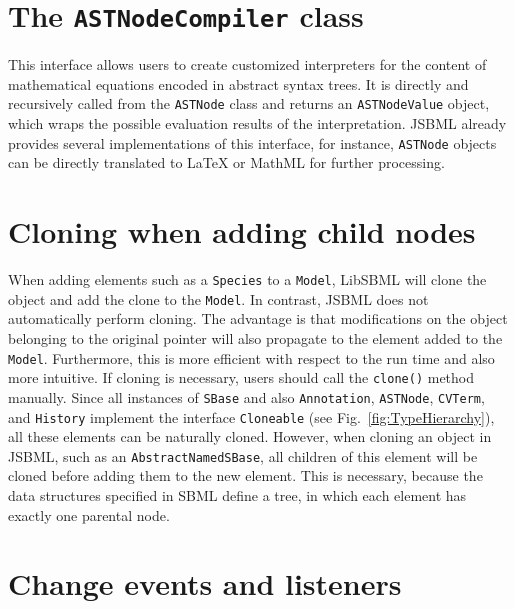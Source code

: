 \documentclass[
  BCOR12mm,
  letterpaper,
  11pt,
  headsepline,
  pointlessnumbers,
  tablecaptionabove,
  headinclude,
  appendixprefix,
  idxtotoc,
  bibtotoc,
  twoside,
  titlepage
]{scrartcl}
\begin{document}
\section{The \texttt{ASTNodeCompiler} class}

This interface allows users to create customized interpreters for the
content of mathematical equations encoded in abstract syntax trees. It
is directly and recursively called from the \verb!ASTNode! class and returns
an \verb!ASTNodeValue! object, which wraps the possible evaluation results of
the interpretation. JSBML already provides several implementations of
this interface, for instance, \verb!ASTNode! objects can be directly translated
to LaTeX or MathML for further processing.

\section{Cloning when adding child nodes}

When adding elements such as a \verb!Species! to a \verb!Model!, LibSBML will
clone the object and add the clone to the \verb!Model!. In contrast, JSBML does
not automatically perform cloning. The advantage is that modifications on the
object belonging to the original pointer will also propagate to the element
added to the \verb!Model!. Furthermore, this is more efficient with respect to
the run time and also more intuitive. If cloning is necessary, users should call
the \verb!clone()! method manually. Since all instances of \verb!SBase! and also
\verb!Annotation!, \verb!ASTNode!, \verb!CVTerm!, and \verb!History! implement
the interface \verb!Cloneable! (see Fig.~\vref{fig:TypeHierarchy}), all these
elements can be naturally cloned. However, when cloning an object in JSBML, such
as an \verb!AbstractNamedSBase!, all children of this element will be cloned
before adding them to the new element. This is necessary, because the data
structures specified in SBML define a tree, in which each element has exactly
one parental node.


\section{Change events and listeners}
\end{document}
